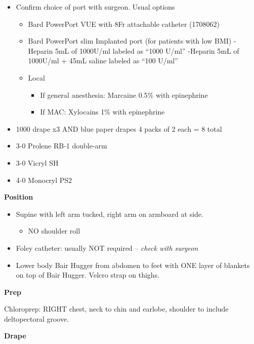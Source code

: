 \documentclass[
]{book}
\providecommand{\tightlist}{%
  \setlength{\itemsep}{0pt}\setlength{\parskip}{0pt}}
\begin{document}
\begin{itemize}
\tightlist
\item
  Confirm choice of port with surgeon. Usual options

  \begin{itemize}
  \tightlist
  \item
    Bard PowerPort VUE with 8Fr attachable catheter (1708062)
  \item
    Bard PowerPort slim Implanted port (for patients with low BMI)
    -Heparin 5mL of 1000U/ml labeled as ``1000 U/ml''
    -Heparin 5mL of 1000U/ml + 45mL saline labeled as ``100 U/ml''
  \item
    Local

    \begin{itemize}
    \tightlist
    \item
      If general anesthesia: Marcaine 0.5\% with epinephrine
    \item
      If MAC: Xylocains 1\% with epinephrine
    \end{itemize}
  \end{itemize}
\item
  1000 drape x3 AND blue paper drapes 4 packs of 2 each = 8 total
\item
  3-0 Prolene RB-1 double-arm
\item
  3-0 Vicryl SH
\item
  4-0 Monocryl PS2
\end{itemize}

\textbf{Position}

\begin{itemize}
\tightlist
\item
  Supine with left arm tucked, right arm on armboard at side.

  \begin{itemize}
  \tightlist
  \item
    NO shoulder roll
  \end{itemize}
\item
  Foley catheter: usually NOT required -- \emph{check with surgeon}
\item
  Lower body Bair Hugger from abdomen to feet with ONE layer of blankets on top of Bair Hugger. Velcro strap on thighs.
\end{itemize}

\textbf{Prep}

Chloroprep: RIGHT chest, neck to chin and earlobe, shoulder to include deltopectoral groove.

\textbf{Drape}
\end{document}
